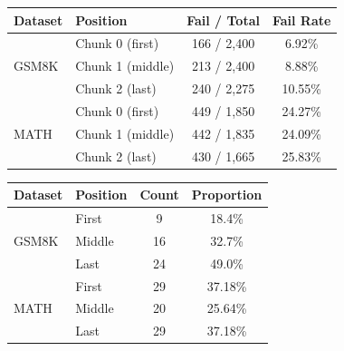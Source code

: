 \documentclass[12pt]{report}
\begin{document}
\begin{table}[t]
\centering

\begin{minipage}[t]{0.475\textwidth}
\centering
{}
\label{tab:quiz-fail-position-gsm8k-math}
\footnotesize
\setlength{\tabcolsep}{4pt}
\begin{tabular}{@{}llcc@{}}
\toprule
\textbf{Dataset} & \textbf{Position} & \textbf{Fail / Total} & \textbf{Fail Rate} \\
\midrule
\multirow{3}{*}{GSM8K}
& Chunk 0 (first)  & 166 / 2{,}400 & 6.92\% \\
& Chunk 1 (middle) & 213 / 2{,}400 & 8.88\% \\
& Chunk 2 (last)   & 240 / 2{,}275 & 10.55\% \\
\midrule
\multirow{3}{*}{MATH}
& Chunk 0 (first)  & 449 / 1{,}850 & 24.27\% \\
& Chunk 1 (middle) & 442 / 1{,}835 & 24.09\% \\
& Chunk 2 (last)   & 430 / 1{,}665 & 25.83\% \\
\bottomrule
\end{tabular}
\end{minipage}
\hspace{0.03\textwidth}
\begin{minipage}[t]{0.475\textwidth}
\centering
{}
\label{tab:weak-chunk-position-gsm8k-math}
\footnotesize
\setlength{\tabcolsep}{4pt}
\begin{tabular}{@{}llcc@{}}
\toprule
\textbf{Dataset} & \textbf{Position} & \textbf{Count} & \textbf{Proportion} \\
\midrule
\multirow{3}{*}{GSM8K}
& First  &  9 & 18.4\% \\
& Middle & 16 & 32.7\% \\
& Last   & 24 & 49.0\% \\
\midrule
\multirow{3}{*}{MATH}
& First  & 29 & 37.18\% \\
& Middle & 20 & 25.64\% \\
& Last   & 29 & 37.18\% \\
\bottomrule
\end{tabular}
\end{minipage}

\end{table}
\end{document}
